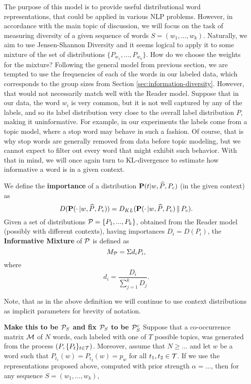 The purpose of this model is to provide useful distributional
word representations, that could be applied in various NLP
problems. However, in accordance with the main topic of discussion, we will
focus on the task of measuring diversity of a given sequence of words
$S=(w_1,...,w_k)$. Naturally, we aim to use Jensen-Shannon Diversity
and it seems logical to apply it to some mixture of the set of
distributions $\{P_{w_1},...,P_{w_k}\}$. How do we choose the weights
for the mixture? Following the general model from previous section, we
are tempted to use the frequencies of each of the words in our labeled data,
which corresponds to the group sizes from Section
\ref{sec:information-diversity}. However, that would not 
necessarily match well with the Reader model. Suppose that in our
data, the word $w_i$ is very common, but it is not well captured by any of
the labels, and so its label distribution very close to the overall
label distribution $P$, making it uninformative. For example, in our
experiments the labels come from a topic model, where a stop word may
behave in such a fashion. Of course, that is why stop words are
generally removed from data before topic modeling, but we cannot
expect to filter out every word that might exhibit such behavior. With
that in mind, we will once again turn to KL-divergence to
estimate how informative a word is in a given context.

\bed
We define the {\bf importance} of a distribution $\operatorname{\mathbf{P}}(t|w,\widehat{P},P_c)$ (in 
the given context) as
\[D(\operatorname{\mathbf{P}}(\cdot\,|w,\widehat{P},P_c)) =
D_{KL}(\operatorname{\mathbf{P}}(\cdot\,|w,\widehat{P},P_c)\,\|\,P_c).\]
Given a set of distributions ${\mathcal P} = \{P_1,...,P_k\}$, obtained from the
Reader model (possibly with different contexts), having importances
$D_i=D(P_i)$, the {\bf Informative Mixture} of ${\mathcal P}$ is defined as
\[M_{{\mathcal P}} = \Sigma d_i P_i,\]
where
\[d_i = \frac{D_i}{\sum_{j=1}^k D_j}.\]
\eed

Note, that as in the above definition we will continue to use context
distributions as implicit parameters for brevity of notation. 

{\bf Make this to be ${\mathcal P}_S$ and fix ${\mathcal P}_S$ to be ${\mathcal P}_S^c$}
\bep
Suppose that a co-occurrence matrix ${\mathcal M}$ of $N$ words, each labeled
with one of $T$ possible topics, was generated from the process
$(P,\{P_t\}_{t\in {\mathcal T}})$. Moreover, assume that $N\geq ...$ and let
$w$ be a word such that $P_{t_1}(w)=P_{t_2}(w)=p_w$ for all
$t_1,t_2\in {\mathcal T}$. If we use the representations proposed above,
computed with prior strength $\alpha = ...$, then for any sequence
$S=(w_1,...,w_k)$, 
\eep

